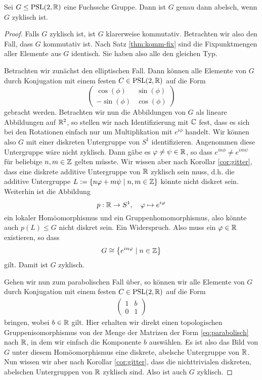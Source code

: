 \begin{thm}
  \label{thm:abelsch-zyklisch}
  Sei $G \leq \operatorname{PSL}(2, \mathbb{R})$ eine Fuchssche Gruppe. Dann ist $G$ genau
  dann abelsch, wenn $G$ zyklisch ist.
\end{thm}

\begin{proof}
  Falls $G$ zyklisch ist, ist $G$ klarerweise kommutativ. Betrachten
  wir also den Fall, dass $G$ kommutativ ist. Nach Satz
  \ref{thm:komm-fix} sind die Fixpunktmengen aller Elemente aus $G$
  identisch. Sie haben also alle den gleichen Typ.

  Betrachten wir zunächst den elliptischen Fall. Dann können alle
  Elemente von $G$ durch Konjugation mit einem festen $C \in \operatorname{PSL}(2,\mathbb{R})$ auf
  die Form
  \[
  \begin{pmatrix}
    \cos(\phi) & \sin(\phi) \\
    -\sin(\phi) & \cos(\phi)
  \end{pmatrix}
  \]
  gebracht werden. Betrachten wir nun die Abbildungen von $G$ als
  lineare Abbildungen auf $\mathbb{R}^2$, so stellen wir nach Identifizierung
  mit $\mathbb{C}$ fest, dass es sich bei den Rotationen einfach nur um
  Multiplikation mit $e^{i\phi}$ handelt. Wir können also $G$ mit
  einer diskreten Untergruppe von $S^1$ identifizieren. Angenommen
  diese Untergruppe wäre nicht zyklisch. Dann gäbe es $\varphi \neq \psi
  \in \mathbb{R}$, so dass $e^{in\phi} \neq e^{im\psi}$ für beliebige $n, m
  \in \mathbb{Z}$ gelten müsste. Wir wissen aber nach Korollar \ref{cor:gitter}, dass
  eine diskrete additive Untergruppe von $\mathbb{R}$ zyklisch sein muss,
  d.h. die additive Untergruppe $L := \{ n \varphi + m \psi \mid n,m \in
  \mathbb{Z}\}$ könnte nicht diskret sein. Weiterhin ist die Abbildung
  \[
  p: \mathbb{R} \rightarrow S^1, \quad \varphi \mapsto e^{i\varphi}
  \]
  ein lokaler Homöomorphismus und ein Gruppenhomomorphismus, also könnte auch $p(L) \leq G$ nicht diskret sein. Ein
  Widerspruch. Also muss ein $\varphi \in \mathbb{R}$ existieren, so dass
  \[
  G \cong \left \{ e^{in\varphi} \mid n \in \mathbb{Z} \right \}
  \]
  gilt. Damit ist $G$ zyklisch.

  Gehen wir nun zum parabolischen Fall über, so können wir alle
  Elemente von $G$ durch Konjugation mit einem festen $C \in \operatorname{PSL}(2,
  \mathbb{R})$ auf die Form
  \begin{align}
    \label{eq:parabolisch}
  \begin{pmatrix}
    1 & b\\
    0 & 1
  \end{pmatrix}
  \end{align}
  bringen, wobei $b \in \mathbb{R}$ gilt. Hier erhalten wir direkt einen
  topologischen Gruppenisomorphismus von der Menge der Matrizen der Form
  \eqref{eq:parabolisch} nach $\mathbb{R}$, in dem wir einfach die Komponente
  $b$ auswählen. Es ist also das Bild von $G$ unter diesem
  Homöomorphismus eine diskrete, abelsche
  Untergruppe von $\mathbb{R}$. Nun wissen wir aber nach Korollar \ref{cor:gitter},
  dass die nichttrivialen diskreten, abelschen Untergruppen von $\mathbb{R}$
  zyklisch sind. Also ist auch $G$ zyklisch.


\end{proof}
